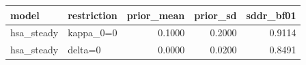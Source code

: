 \begin{tabular}{llrrr}
\toprule
model & restriction & prior\_mean & prior\_sd & sddr\_bf01 \\
\midrule
hsa\_steady & kappa\_0=0 & 0.1000 & 0.2000 & 0.9114 \\
hsa\_steady & delta=0 & 0.0000 & 0.0200 & 0.8491 \\
\bottomrule
\end{tabular}
